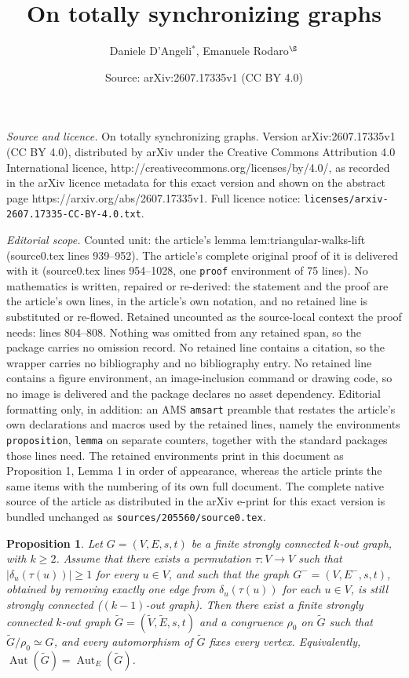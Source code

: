 \documentclass[10pt,a4paper]{amsart}
\title{On totally synchronizing graphs}
\author{Daniele D'Angeli$^{\ast}$, Emanuele Rodaro$^{\S}$}
\date{Source: arXiv:2607.17335v1 (CC BY 4.0)}
\newtheorem{proposition}{Proposition}
\DeclareMathOperator{\Aut}{Aut}
\begin{document}
\maketitle

\noindent\emph{Source and licence.} On totally synchronizing graphs. Version arXiv:2607.17335v1 (CC BY 4.0), distributed by arXiv under the Creative Commons Attribution 4.0 International licence, http://creativecommons.org/licenses/by/4.0/, as recorded in the arXiv licence metadata for this exact version and shown on the abstract page https://arxiv.org/abs/2607.17335v1. Full licence notice: \texttt{licenses/arxiv-2607.17335-CC-BY-4.0.txt}.\par\smallskip

\noindent\textit{Editorial scope.} Counted unit: the article's lemma lem:triangular-walks-lift (source0.tex lines 939--952). The article's complete original proof of it is delivered with it (source0.tex lines 954--1028, one \texttt{proof} environment of 75 lines). No mathematics is written, repaired or re-derived: the statement and the proof are the article's own lines, in the article's own notation, and no retained line is substituted or re-flowed.  Retained uncounted as the source-local context the proof needs: lines 804--808.  Nothing was omitted from any retained span, so the package carries no omission record.  No retained line contains a citation, so the wrapper carries no bibliography and no bibliography entry.  No retained line contains a figure environment, an image-inclusion command or drawing code, so no image is delivered and the package declares no asset dependency.  Editorial formatting only, in addition: an AMS \texttt{amsart} preamble that restates the article's own declarations and macros used by the retained lines, namely the environments \texttt{proposition}, \texttt{lemma} on separate counters, together with the standard packages those lines need.  The retained environments print in this document as Proposition 1, Lemma 1 in order of appearance, whereas the article prints the same items with the numbering of its own full document.  The complete native source of the article as distributed in the arXiv e-print for this exact version is bundled unchanged as \texttt{sources/205560/source0.tex}.
\begin{proposition}\label{prop:vertex-rigid-refinement-permutation}
Let $G=(V,E,s,t)$ be a finite strongly connected $k$-out graph, with $k\ge 2$.
Assume that there exists a permutation $\tau:V\to V$ such that $|\delta_u(\tau(u))|\ge 1$ for every $u\in V$, and such that the graph $G^-=(V,E^-,s,t)$, obtained by removing exactly one edge from $\delta_u(\tau(u))$ for each $u\in V$, is still strongly connected ($(k-1)$-out graph). Then there exist a finite strongly connected $k$-out graph $\widetilde G=(\widetilde V,\widetilde E,s,t)$ and a congruence $\rho_0$ on $\widetilde G$ such that $\widetilde G/\rho_0 \simeq G$, 
and every automorphism of $\widetilde G$ fixes every vertex. Equivalently, $\Aut(\widetilde G)=\Aut_E(\widetilde G)$.
\end{proposition}
\end{document}
